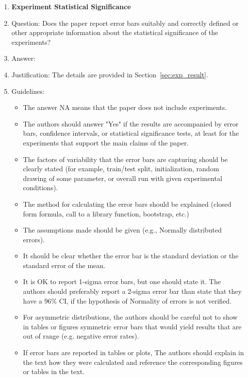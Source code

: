 \documentclass{article}
\begin{document}
\begin{enumerate}
\item {\bf Experiment Statistical Significance}
    \item[] Question: Does the paper report error bars suitably and correctly defined or other appropriate information about the statistical significance of the experiments?
    \item[] Answer: \answerYes{}  %
    \item[] Justification: The details are provided in Section~\ref{sec:exp_result}.
    \item[] Guidelines:
    \begin{itemize}
        \item The answer NA means that the paper does not include experiments.
        \item The authors should answer "Yes" if the results are accompanied by error bars, confidence intervals, or statistical significance tests, at least for the experiments that support the main claims of the paper.
        \item The factors of variability that the error bars are capturing should be clearly stated (for example, train/test split, initialization, random drawing of some parameter, or overall run with given experimental conditions).
        \item The method for calculating the error bars should be explained (closed form formula, call to a library function, bootstrap, etc.)
        \item The assumptions made should be given (e.g., Normally distributed errors).
        \item It should be clear whether the error bar is the standard deviation or the standard error of the mean.
        \item It is OK to report 1-sigma error bars, but one should state it. The authors should preferably report a 2-sigma error bar than state that they have a 96\% CI, if the hypothesis of Normality of errors is not verified.
        \item For asymmetric distributions, the authors should be careful not to show in tables or figures symmetric error bars that would yield results that are out of range (e.g. negative error rates).
        \item If error bars are reported in tables or plots, The authors should explain in the text how they were calculated and reference the corresponding figures or tables in the text.
    \end{itemize}


\end{enumerate}
\end{document}
